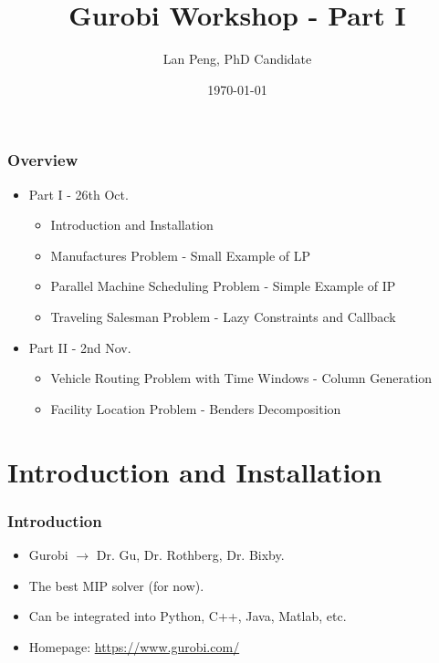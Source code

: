 \documentclass[10pt]{beamer}
\title{Gurobi Workshop - Part I}
\author{Lan Peng, PhD Candidate}
\institute{Department of Industrial \& Systems Engineering\\University at Buffalo, SUNY}
\date{\today}
\begin{document}
	\begin{frame}[plain]
		\titlepage
	\end{frame}

	\begin{frame}
		\frametitle{Overview}
		\begin{itemize}
			\item Part I - 26th Oct.
			\begin{itemize}
				\item Introduction and Installation
				\item Manufactures Problem - Small Example of LP
				\item Parallel Machine Scheduling Problem - Simple Example of IP
				\item Traveling Salesman Problem - Lazy Constraints and Callback
			\end{itemize}
			\item Part II - 2nd Nov.
			\begin{itemize}
				\item Vehicle Routing Problem with Time Windows - Column Generation
				\item Facility Location Problem - Benders Decomposition
			\end{itemize}
		\end{itemize}
	\end{frame}

	\section{Introduction and Installation}
		\begin{frame}
			\frametitle{Introduction}
			\begin{itemize}
				\item Gurobi $\rightarrow$ Dr. Gu, Dr. Rothberg, Dr. Bixby.
				\item The best MIP solver (for now).
				\item Can be integrated into Python, C++, Java, Matlab, etc.
				\item Homepage: \textcolor[rgb]{0,0,1}{\url{https://www.gurobi.com/}}
			\end{itemize}			
		\end{frame}
\end{document}

